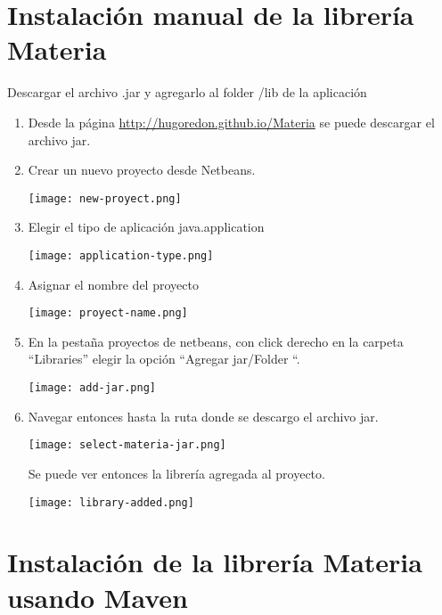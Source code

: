 	\section{Instalación manual de la librería Materia}\label{sec:manualInstall}
		Descargar el archivo .jar y agregarlo al folder /lib de la aplicación
		\begin{enumerate}
			\item Desde la página \url{http://hugoredon.github.io/Materia} se puede descargar el archivo jar.

			\item Crear un nuevo proyecto desde Netbeans.

			\begin{center}
			  \texttt{[image: new-proyect.png]}
			\end{center}

			\item Elegir el tipo de aplicación java.application 
			\begin{center}
			  \texttt{[image: application-type.png]} 
			\end{center}
			\item Asignar el nombre del proyecto 
			\begin{center}
			  \texttt{[image: proyect-name.png]} 
			\end{center}
			\item En la pestaña proyectos de netbeans, con click derecho en la carpeta “Libraries” elegir la opción “Agregar jar/Folder “.
			\begin{center}
			  \texttt{[image: add-jar.png]} 
			\end{center}


			 \item Navegar entonces hasta la ruta donde se descargo el archivo jar. 

			\begin{center}
			  \texttt{[image: select-materia-jar.png]} 
			\end{center}

			Se puede ver entonces la librería agregada al proyecto.

			\begin{center}
			  \texttt{[image: library-added.png]} 
			\end{center}
		\end{enumerate}

	\section{Instalación de la librería Materia usando Maven}\label{sec:mavenInstall}

